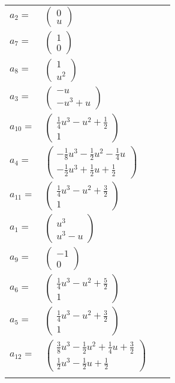 \documentclass[1p]{elsarticle_modified}
\theoremstyle{definition}
\begin{document}
\begin{tabular}{m{7pt} m{180pt} m{7pt} m{180pt} }
\flushright $a_{2}=$&$\begin{pmatrix}0\\u\end{pmatrix}$ \\
\flushright $a_{7}=$&$\begin{pmatrix}1\\0\end{pmatrix}$ \\
\flushright $a_{8}=$&$\begin{pmatrix}1\\u^2\end{pmatrix}$ \\
\flushright $a_{3}=$&$\begin{pmatrix}- u\\- u^3+u\end{pmatrix}$ \\
\flushright $a_{10}=$&$\begin{pmatrix}\frac{1}{4} u^3- u^2+\frac{1}{2}\\1\end{pmatrix}$ \\
\flushright $a_{4}=$&$\begin{pmatrix}-\frac{1}{8} u^3-\frac{1}{2} u^2-\frac{1}{4} u\\-\frac{1}{2} u^3+\frac{1}{2} u+\frac{1}{2}\end{pmatrix}$ \\
\flushright $a_{11}=$&$\begin{pmatrix}\frac{1}{4} u^3- u^2+\frac{3}{2}\\1\end{pmatrix}$ \\
\flushright $a_{1}=$&$\begin{pmatrix}u^3\\u^3- u\end{pmatrix}$ \\
\flushright $a_{9}=$&$\begin{pmatrix}-1\\0\end{pmatrix}$ \\
\flushright $a_{6}=$&$\begin{pmatrix}\frac{1}{4} u^3- u^2+\frac{5}{2}\\1\end{pmatrix}$ \\
\flushright $a_{5}=$&$\begin{pmatrix}\frac{1}{4} u^3- u^2+\frac{3}{2}\\1\end{pmatrix}$ \\
\flushright $a_{12}=$&$\begin{pmatrix}\frac{3}{8} u^3-\frac{1}{2} u^2+\frac{1}{4} u+\frac{3}{2}\\\frac{1}{2} u^3-\frac{1}{2} u+\frac{1}{2}\end{pmatrix}$\\&\end{tabular}
\end{document}
